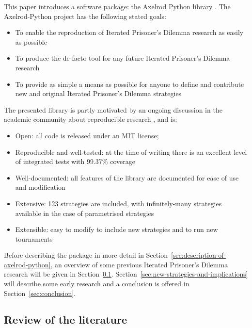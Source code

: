 \documentclass{article}
\begin{document}
This paper introduces a software package: the Axelrod Python library
\cite{Axelrod-Pythonprojectteam2015}. The Axelrod-Python project has the
following stated goals:

\begin{itemize}
    \item To enable the reproduction of Iterated Prisoner's Dilemma
    research as easily as possible
    \item To produce the de-facto tool for any future Iterated Prisoner's
    Dilemma research
    \item To provide as simple a means as possible for anyone to define and
    contribute new and original Iterated Prisoner's Dilemma strategies
\end{itemize}

The presented library is partly motivated by an ongoing discussion in the academic community
about reproducible research \cite{Crick2014a, Hong2015a, Prlic2012, Sandve2013},
and is:

\begin{itemize}
    \item Open: all code is released under an MIT license;
    \item Reproducible and well-tested: at the time of writing there is an excellent level of
        integrated tests with 99.37\% coverage
    \item Well-documented: all features of the library are documented for ease of
        use and modification
    \item Extensive: 123 strategies are included, with infinitely-many
        strategies available in the case of parametrised strategies
    \item Extensible: easy to modify to include new strategies and to run new tournaments
\end{itemize}

Before describing the package in more detail in
Section~\ref{sec:description-of-axelrod-python}, an overview of some previous
Iterated Prisoner's Dilemma research will be given in
Section~\ref{sec:review}. Section~\ref{sec:new-strategies-and-implications} will
describe some early research and a conclusion is offered in
Section~\ref{sec:conclusion}.

\subsection{Review of the literature}\label{sec:review}
\end{document}
